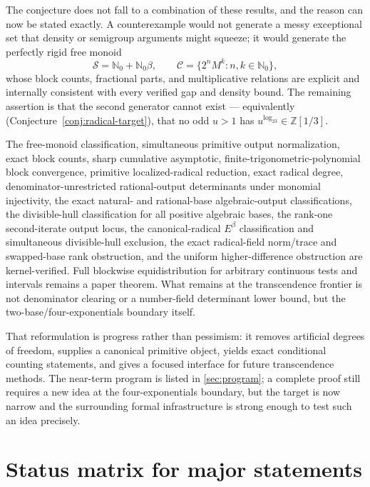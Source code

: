 \documentclass[11pt,oneside]{article}
\theoremstyle{definition}
\theoremstyle{remark}
\newcommand{\Nzero}{\mathbb N_0}
\newcommand{\Z}{\mathbb Z}
\newcommand{\Sol}{\mathcal S}
\newcommand{\Cand}{\mathcal C}
\newcommand{\Zthree}{\Z[1/3]}
\begin{document}
The conjecture does not fall to a combination of these results, and the reason can now be
stated exactly.  A counterexample would not generate a messy exceptional set that density or
semigroup arguments might squeeze; it would generate the perfectly rigid free monoid
\[
\Sol=\Nzero+\Nzero\beta,\qquad\Cand=\{2^nM^k:n,k\in\Nzero\},
\]
whose block counts, fractional parts, and multiplicative relations are explicit and
internally consistent with every verified gap and density bound.  The remaining assertion is
that the second generator cannot exist --- equivalently
(Conjecture~\ref{conj:radical-target}), that no odd $u>1$ has $u^{\log_23}\in\Zthree$.

The free-monoid classification, simultaneous primitive output normalization, exact block
counts, sharp cumulative asymptotic, finite-trigonometric-polynomial block convergence,
primitive localized-radical reduction, exact radical degree, denominator-unrestricted
rational-output determinants under monomial injectivity, the exact natural- and
rational-base algebraic-output classifications, the divisible-hull classification for all
positive algebraic bases, the rank-one second-iterate output locus,
the canonical-radical $E^\beta$ classification and simultaneous divisible-hull exclusion,
the exact radical-field norm/trace and swapped-base rank obstruction, and the uniform
higher-difference obstruction are kernel-verified.  Full blockwise equidistribution for
arbitrary continuous tests and intervals remains a paper theorem.  What remains at the
transcendence frontier is not denominator clearing or a number-field determinant lower
bound, but the two-base/four-exponentials boundary itself.

That reformulation is progress rather than pessimism: it removes artificial degrees of
freedom, supplies a canonical primitive object, yields exact conditional counting statements,
and gives a focused interface for future transcendence methods.  The near-term program is
listed in \cref{sec:program}; a complete proof still requires a new idea at the
four-exponentials boundary, but the target is now narrow and the surrounding formal
infrastructure is strong enough to test such an idea precisely.

\appendix

\section{Status matrix for major statements}
\label{app:status}
\end{document}
